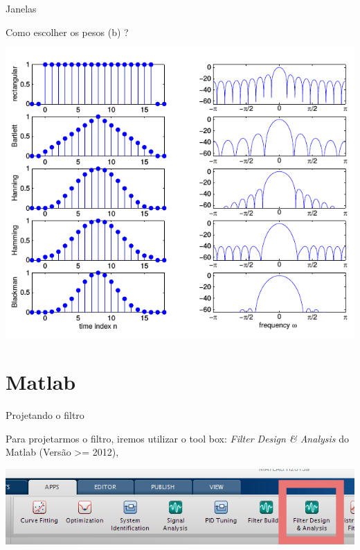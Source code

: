 \documentclass{beamer}
\begin{document}
\begin{frame}{Janelas}

	Como escolher os pesos (b) ?	
	\pause

	\begin{center}
	\includegraphics[width=0.8\linewidth]{fir_janelas}
	\end{center}
\end{frame}

\section{Matlab}

\begin{frame}{Projetando o filtro}
	
	Para projetarmos o filtro, iremos utilizar o tool box: \textit{Filter Design \& Analysis} do Matlab (Versão >= 2012), 
	
\begin{center}
\includegraphics[width=0.7\linewidth]{matlab1}
\end{center}

\end{frame}
\end{document}
